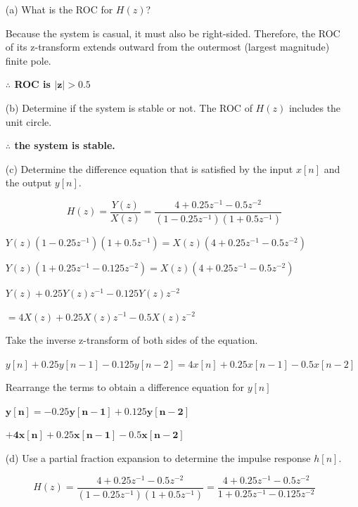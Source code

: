 \documentclass[fleqn]{article}
\begin{document}
\begin{enumerate}[nolistsep]
			\begin{enumerate}[nolistsep]
				\item[(a)] What is the ROC for $H(z)$?
				
					Because the system is casual, it must also be right-sided. Therefore, the ROC of its z-transform extends outward from
the outermost (largest magnitude) finite pole.

					\textbf{$\mathbf{\therefore}$ ROC is $\mathbf{|z| > 0.5}$}
					
				\item[(b)] Determine if the system is stable or not.
					The ROC of $H(z)$ includes the unit circle.
				
					\textbf{$\mathbf{\therefore}$ the system is stable.}
				 
				 \item[(c)] Determine the difference equation that is satisfied by the input $x[n]$ and the output $y[n]$.
				 
				 	\begin{equation*}
				 		H(z) = \frac{Y(z)}{X(z)} = \frac{4 + 0.25z^{-1}-0.5z^{-2}}{(1-0.25z^{-1})(1 + 0.5z^{-1})}
				 	\end{equation*}
				 	
				 	$Y(z)(1-0.25z^{-1})(1 + 0.5z^{-1}) = X(z)(4 + 0.25z^{-1}-0.5z^{-2})$
				 	
				 	$Y(z)(1 + 0.25z^{-1} - 0.125z^{-2}) = X(z)(4 + 0.25z^{-1}-0.5z^{-2})$
				 	
				 	$Y(z) + 0.25Y(z)z^{-1} - 0.125Y(z)z^{-2}$
				 	
				 	$= 4X(z) + 0.25X(z)z^{-1}-0.5X(z)z^{-2}$
				 	
				 	Take the inverse z-transform of both sides of the equation.
				 	
				 	$y[n] + 0.25y[n-1] - 0.125y[n-2] = 4x[n] + 0.25x[n-1] - 0.5x[n-2]$
				 	
				 	Rearrange the terms to obtain a difference equation for $y[n]$
				 	
				 	$\mathbf{y[n] = -0.25y[n-1] + 0.125y[n-2]}$
				 	
				 	$\mathbf{ + 4x[n] + 0.25x[n-1] - 0.5x[n-2]}$
				 	
				 \item[(d)] Use a partial fraction expansion to determine the impulse response $h[n]$.
				 
				 	\begin{equation*}
				 		H(z) = \frac{4 + 0.25z^{-1}-0.5z^{-2}}{(1-0.25z^{-1})(1 + 0.5z^{-1})} = \frac{4 + 0.25z^{-1}-0.5z^{-2}}{1 + 0.25z^{-1} - 0.125z^{-2}}
				 	\end{equation*}
				 	

\end{enumerate}
\end{enumerate}
\end{document}

